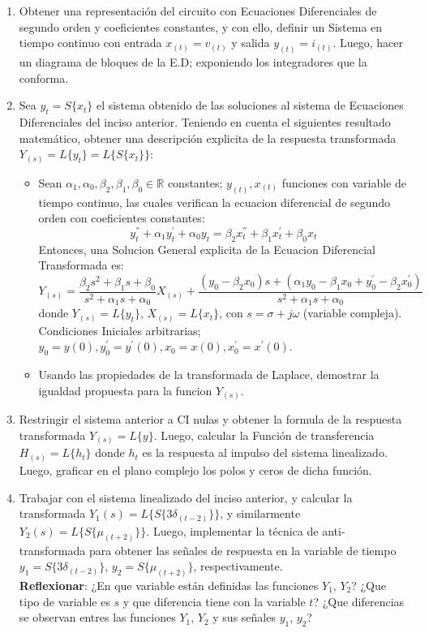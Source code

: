 \documentclass[12pt,a4paper]{report}
\begin{document}
  \begin{enumerate}[label=\alph*)]
  \item Obtener una representación del circuito con Ecuaciones Diferenciales de segundo orden y coeficientes constantes, y con ello, definir un Sistema en tiempo continuo con entrada $x_{(t)} = v_{(t)}$ y salida $y_{(t)} = i_{(t)}$. Luego, hacer un diagrama de bloques de la E.D; exponiendo los integradores que la conforma.

  \item Sea $y_t = S\{x_t\}$ el sistema obtenido de las soluciones al sistema de Ecuaciones Diferenciales del inciso anterior. Teniendo en cuenta el siguientes resultado matemático, obtener una descripción explicita de la respuesta transformada $Y_{(s)} = L\{y_t\} = L\{S\{x_t\}\}$:
  \begin{itemize}
    \item Sean $\alpha_1, \alpha_0, \beta_2, \beta_1, \beta_0 \in \mathbb{R}$ constantes; $y_{(t)}, x_{(t)}$ funciones con variable de tiempo continuo, las cuales verifican la ecuacion diferencial de segundo orden con coeficientes constantes:
    $$y_t^{''} + \alpha_1 y_t^{'} + \alpha_0 y_t = \beta_2 x_t^{''} + \beta_1 x_t^{'} + \beta_0 x_t$$
    Entonces, una Solucion General explicita de la Ecuacion Diferencial Transformada es:
    $$Y_{(s)} = \frac{\beta_2 s^2 + \beta_1 s + \beta_0}{s^2 + \alpha_1 s + \alpha_0}X_{(s)} + \frac{(y_0 - \beta_2 x_0)s + (\alpha_1 y_0 - \beta_1 x_0 + y_0^{'} - \beta_2 x_0^{'})}{s^2 + \alpha_1 s + \alpha_0}$$
    donde $Y_{(s)} = L\{y_t\}$, $X_{(s)} = L\{x_t\}$, con $s = \sigma + j \omega$ (variable compleja). Condiciones Iniciales arbitrarias; $y_0 = y(0), y_0^{'} = y^{'}(0), x_0 = x(0), x_0^{'} = x^{'}(0)$.
    \item Usando las propiedades de la transformada de Laplace, demostrar la igualdad propuesta para la funcion $Y_{(s)}$.
  \end{itemize}

  \item Restringir el sistema anterior a CI nulas y obtener la formula de la respuesta transformada $Y_{(s)} = L\{y\}$. Luego, calcular la Función de transferencia $H_{(s)} = L\{h_t\}$ donde $h_t$ es la respuesta al impulso del sistema linealizado. Luego, graficar en el plano complejo los polos y ceros de dicha función.

  \item Trabajar con el sistema linealizado del inciso anterior, y calcular la transformada $Y_1(s) = L\{S\{3\delta_{(t-2)}\}\}$, y similarmente $Y_2(s) = L\{S\{\mu_{(t+2)}\}\}$. Luego, implementar la técnica de anti-transformada para obtener las señales de respuesta en la variable de tiempo $y_1 = S\{3\delta_{(t-2)}\}$, $y_2 = S\{\mu_{(t+2)}\}$, respectivamente.\\
  \textbf{Reflexionar}: ¿En que variable están definidas las funciones $Y_1$, $Y_2$? ¿Que tipo de variable es $s$ y que diferencia tiene con la variable $t$? ¿Que diferencias se observan entres las funciones $Y_1$, $Y_2$ y sus señales $y_1$, $y_2$?


\end{enumerate}
\end{document}
